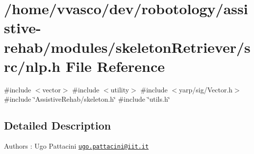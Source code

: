 \section{/home/vvasco/dev/robotology/assistive-\/rehab/modules/skeleton\+Retriever/src/nlp.h File Reference}
\label{nlp_8h}
{\ttfamily \#include $<$vector$>$}\newline
{\ttfamily \#include $<$utility$>$}\newline
{\ttfamily \#include $<$yarp/sig/\+Vector.\+h$>$}\newline
{\ttfamily \#include \char`\"{}Assistive\+Rehab/skeleton.\+h\char`\"{}}\newline
{\ttfamily \#include \char`\"{}utils.\+h\char`\"{}}\newline


\subsection{Detailed Description}
\begin{DoxyAuthor}{Authors}
\+: Ugo Pattacini \href{mailto:ugo.pattacini@iit.it}{\tt ugo.\+pattacini@iit.\+it} 
\end{DoxyAuthor}
